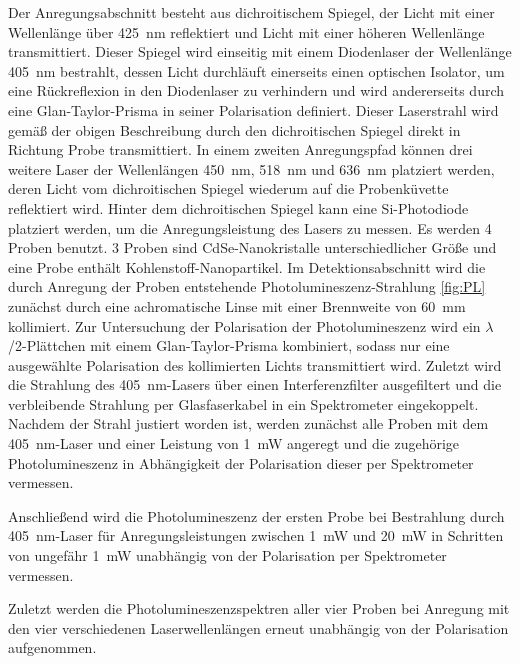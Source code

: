         Der Anregungsabschnitt besteht aus dichroitischem Spiegel, der Licht mit einer Wellenlänge über \SI{425}{\nano\metre} reflektiert und Licht mit einer höheren Wellenlänge transmittiert. Dieser Spiegel 
        wird einseitig mit einem Diodenlaser der Wellenlänge \SI{405}{\nano\metre} bestrahlt, dessen Licht durchläuft einerseits einen optischen Isolator, um eine Rückreflexion in den Diodenlaser zu verhindern 
        und wird andererseits durch eine Glan-Taylor-Prisma in seiner Polarisation definiert. Dieser Laserstrahl wird gemäß der obigen Beschreibung durch den dichroitischen Spiegel direkt in Richtung Probe
        transmittiert. In einem zweiten Anregungspfad können drei weitere Laser der Wellenlängen \SI{450}{\nano\metre}, \SI{518}{\nano\metre} und \SI{636}{\nano\metre} platziert werden, deren Licht vom 
        dichroitischen Spiegel wiederum auf die Probenküvette reflektiert wird. Hinter dem dichroitischen Spiegel kann eine Si-Photodiode platziert werden, um die Anregungsleistung des Lasers zu messen.
        Es werden 4 Proben benutzt. 3 Proben sind CdSe-Nanokristalle unterschiedlicher Größe und eine Probe enthält Kohlenstoff-Nanopartikel.
        Im Detektionsabschnitt wird die durch Anregung der Proben entstehende Photolumineszenz-Strahlung \ref{fig:PL} zunächst durch eine achromatische Linse mit einer Brennweite von \SI{60}{\milli\metre} 
        kollimiert. Zur Untersuchung der Polarisation der Photolumineszenz wird ein $\lambda$/2-Plättchen mit einem Glan-Taylor-Prisma kombiniert, sodass nur eine ausgewählte Polarisation des kollimierten 
        Lichts transmittiert wird. Zuletzt wird die Strahlung des \SI{405}{\nano\metre}-Lasers über einen Interferenzfilter ausgefiltert und die verbleibende Strahlung per Glasfaserkabel in ein Spektrometer 
        eingekoppelt.
        \newpage
        Nachdem der Strahl justiert worden ist, werden zunächst alle Proben mit dem \SI{405}{\nano\metre}-Laser und einer Leistung von \SI{1}{\milli\watt} angeregt und die zugehörige Photolumineszenz 
        in Abhängigkeit der Polarisation dieser per Spektrometer vermessen.

        Anschließend wird die Photolumineszenz der ersten Probe bei Bestrahlung durch \SI{405}{\nano\metre}-Laser für Anregungsleistungen zwischen \SI{1}{\milli\watt} und \SI{20}{\milli\watt} in Schritten
        von ungefähr \SI{1}{\milli\watt} unabhängig von der Polarisation per Spektrometer vermessen.

        Zuletzt werden die Photolumineszenzspektren aller vier Proben bei Anregung mit den vier verschiedenen Laserwellenlängen erneut unabhängig von der Polarisation aufgenommen. 

